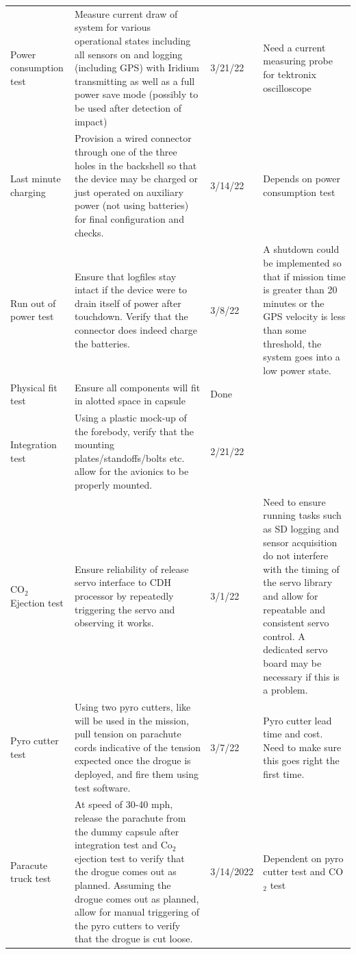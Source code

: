 \documentclass{article}
\begin{document}
\begin{landscape}
\begin{table}[!bp]
\begin{table}[H]
\begin{tabular}{p{3cm} | p{13cm}  L p{5cm}}
					Power consumption test & Measure current draw of system for various operational states including all sensors on and logging (including GPS) with Iridium transmitting as well as a full power save mode (possibly to be used after detection of impact) & 3/21/22 & Need a current measuring probe for tektronix oscilloscope \\
					
					Last minute charging & Provision a wired connector through one of the three holes in the backshell so that the device may be charged or just operated on auxiliary power (not using batteries) for final configuration and checks. & 3/14/22 & Depends on power consumption test \\
					
					Run out of power test & Ensure that logfiles stay intact if the device were to drain itself of power after touchdown. Verify that the connector does indeed charge the batteries. & 3/8/22 & A shutdown could be implemented so that if mission time is greater than 20 minutes or the GPS velocity is less than some threshold, the system goes into a low power state. \\
					
					Physical fit test & Ensure all components will fit in alotted space in capsule & Done & \\
					
					Integration test & Using a plastic mock-up of the forebody, verify that the mounting plates/standoffs/bolts etc. allow for the avionics to be properly mounted.  & 2/21/22 \\
					
					CO$_2$ Ejection test & Ensure reliability of release servo interface to CDH processor by repeatedly triggering the servo and observing it works. & 3/1/22 &  Need to ensure running tasks such as SD logging and sensor acquisition do not interfere with the timing of the servo library and allow for repeatable and consistent servo control. A dedicated servo board may be necessary if this is a problem. \\
					
					Pyro cutter test & Using two pyro cutters, like will be used in the mission, pull tension on parachute cords indicative of the tension expected once the drogue is deployed, and fire them using test software. & 3/7/22 & Pyro cutter lead time and cost. Need to make sure this goes right the first time. \\
					
					Paracute truck test & At speed of 30-40 mph, release the parachute from the dummy capsule after integration test and Co$_2$ ejection test to verify that the drogue comes out as planned. Assuming the drogue comes out as planned, allow for manual triggering of the pyro cutters to verify that the drogue is cut loose. & 3/14/2022 & Dependent on pyro cutter test and CO$_2$ test \\
					

\end{tabular}
\end{table}
\end{table}
\end{landscape}
\end{document}
